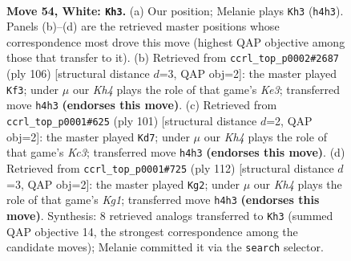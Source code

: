 \documentclass[11pt]{article}
\begin{document}
\clearpage

\begin{figure}[p]\centering
\begin{subfigure}{0.46\textwidth}\centering
\resizebox{\linewidth}{!}{%
\newchessgame
\chessboard[
  setfen={5r1k/3R4/8/P7/7K/8/8/8 w - - 11 54},
  showmover=false,
  pgfstyle=straightmove, color=movearrow, markmove={h4-h3}
]}
\caption{}
\end{subfigure}\hfill
\begin{subfigure}{0.46\textwidth}\centering
\resizebox{\linewidth}{!}{%
\newchessgame
\chessboard[
  setfen={8/3r4/7p/P2k4/6R1/4K3/8/8 w - - 21 54},
  showmover=false,
  pgfstyle=straightmove, color=movearrow, markmove={e3-f3}
]}
\caption{}
\end{subfigure}
\\[4pt]
\begin{subfigure}{0.46\textwidth}\centering
\resizebox{\linewidth}{!}{%
\newchessgame
\chessboard[
  setfen={8/8/2k5/8/1r6/5K1R/8/8 b - - 3 51},
  showmover=false,
  pgfstyle=straightmove, color=movearrow, markmove={c6-d7}
]}
\caption{}
\end{subfigure}\hfill
\begin{subfigure}{0.46\textwidth}\centering
\resizebox{\linewidth}{!}{%
\newchessgame
\chessboard[
  setfen={8/2r1k3/8/6p1/6P1/8/R7/6K1 w - - 11 57},
  showmover=false,
  pgfstyle=straightmove, color=movearrow, markmove={g1-g2}
]}
\caption{}
\end{subfigure}
\caption{\textbf{Move 54, White: \texttt{Kh3}.} (a) Our position; Melanie plays \texttt{Kh3} (\texttt{h4h3}). Panels (b)--(d) are the retrieved master positions whose correspondence most drove this move (highest QAP objective among those that transfer to it). (b) Retrieved from \texttt{ccrl\_top\_p0002\#2687} (ply 106) [structural distance $d$=3, QAP obj=2]: the master played \texttt{Kf3}; under $\mu$ our \emph{Kh4} plays the role of that game's \emph{Ke3}; transferred move \texttt{h4h3} \textbf{(endorses this move)}. (c) Retrieved from \texttt{ccrl\_top\_p0001\#625} (ply 101) [structural distance $d$=2, QAP obj=2]: the master played \texttt{Kd7}; under $\mu$ our \emph{Kh4} plays the role of that game's \emph{Kc3}; transferred move \texttt{h4h3} \textbf{(endorses this move)}. (d) Retrieved from \texttt{ccrl\_top\_p0001\#725} (ply 112) [structural distance $d$=3, QAP obj=2]: the master played \texttt{Kg2}; under $\mu$ our \emph{Kh4} plays the role of that game's \emph{Kg1}; transferred move \texttt{h4h3} \textbf{(endorses this move)}. Synthesis: 8 retrieved analogs transferred to \texttt{Kh3} (summed QAP objective 14, the strongest correspondence among the candidate moves); Melanie committed it via the \texttt{search} selector.}
\label{fig:thought-m106}
\end{figure}
\end{document}
